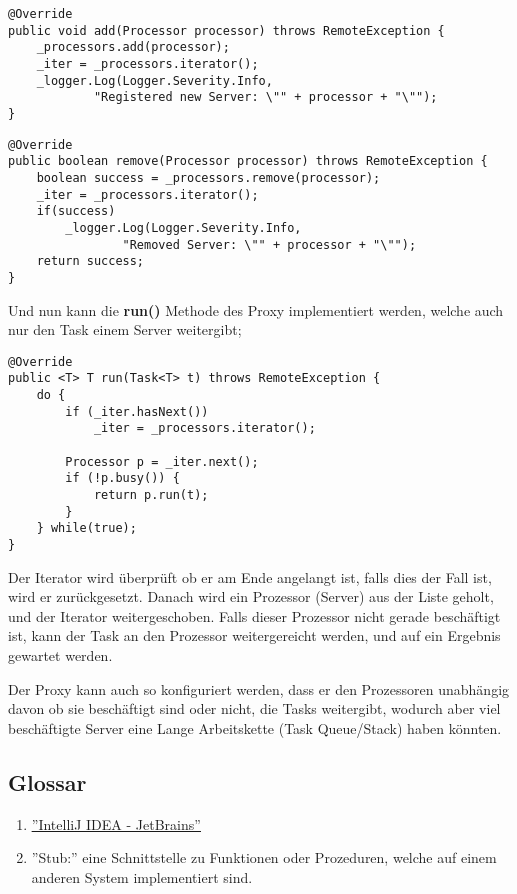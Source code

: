 \begin{lstlisting}[style=Java, caption=Proxy Implementation - Proxy::add]
@Override
public void add(Processor processor) throws RemoteException {
    _processors.add(processor);
    _iter = _processors.iterator();
    _logger.Log(Logger.Severity.Info,
            "Registered new Server: \"" + processor + "\"");
}
\end{lstlisting}

\begin{lstlisting}[style=Java, caption=Proxy Implementation - Proxy::remove]
@Override
public boolean remove(Processor processor) throws RemoteException {
    boolean success = _processors.remove(processor);
    _iter = _processors.iterator();
    if(success)
        _logger.Log(Logger.Severity.Info,
                "Removed Server: \"" + processor + "\"");
    return success;
}
\end{lstlisting}

Und nun kann die \textbf{run()} Methode des Proxy implementiert werden, welche auch nur den Task einem Server weitergibt;

\begin{lstlisting}[style=Java, caption=Proxy Implementation - Proxy::run]
@Override
public <T> T run(Task<T> t) throws RemoteException {
    do {
        if (_iter.hasNext())
            _iter = _processors.iterator();

        Processor p = _iter.next();
        if (!p.busy()) {
            return p.run(t);
        }
    } while(true);
}
\end{lstlisting}

Der Iterator wird überprüft ob er am Ende angelangt ist, falls dies der Fall ist, wird er zurückgesetzt.
Danach wird ein Prozessor (Server) aus der Liste geholt, und der Iterator weitergeschoben.
Falls dieser Prozessor nicht gerade beschäftigt ist, kann der Task an den Prozessor weitergereicht werden, und auf ein Ergebnis gewartet werden.

Der Proxy kann auch so konfiguriert werden, dass er den Prozessoren unabhängig davon ob sie beschäftigt sind oder nicht, die Tasks weitergibt, wodurch aber viel beschäftigte Server eine Lange Arbeitskette (Task Queue/Stack) haben könnten.

\subsection{Glossar}
\begin{enumerate}
    \item \href{https://www.jetbrains.com/idea}{\color{blue}\underline{''IntelliJ IDEA - JetBrains''}}
    \item ''Stub:'' eine Schnittstelle zu Funktionen oder Prozeduren, welche auf einem anderen System implementiert sind.
\end{enumerate}


